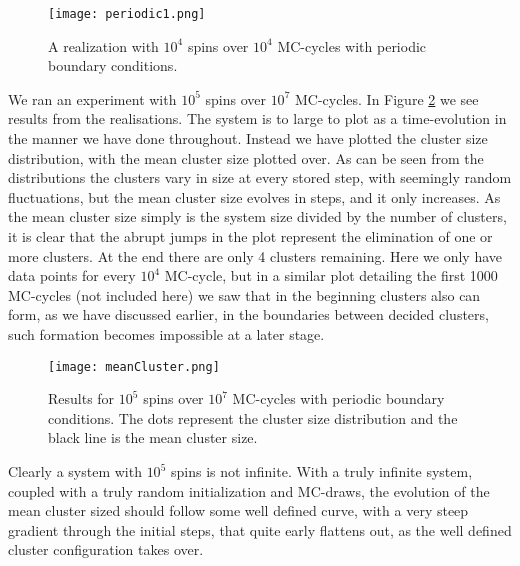 \documentclass[a4paper]{article}
\begin{document}
\begin{figure}[H]
\centerline{\texttt{[image: periodic1.png]}}
\caption{A realization with $10^4$ spins over $10^4$ MC-cycles with periodic boundary conditions.}
\label{fig:per}
\end{figure}

We ran an experiment with $10^5$ spins over $10^7$ MC-cycles. In Figure \ref{fig:menc} we see results from the realisations. The system is to large to plot as a time-evolution in the manner we have done throughout. Instead we have plotted the cluster size distribution, with the mean cluster size plotted over. As can be seen from the distributions the clusters vary in size at every stored step, with seemingly random fluctuations, but the mean cluster size evolves in steps, and it only increases. As the mean cluster size simply is the system size divided by the number of clusters, it is clear that the abrupt jumps in the plot represent the elimination of one or more clusters. At the end there are only 4 clusters remaining. Here we only have data points for every $10^4$ MC-cycle, but in a similar plot detailing the first 1000 MC-cycles (not included here) we saw that in the beginning clusters also can form, as we have discussed earlier, in the boundaries between decided clusters, such formation becomes impossible at a later stage.

\begin{figure}[H]
\centerline{\texttt{[image: meanCluster.png]}}
\caption{Results for  $10^5$ spins over $10^7$ MC-cycles with periodic boundary conditions. The dots represent the cluster size distribution and the black line is the mean cluster size.}
\label{fig:menc}
\end{figure}

Clearly a system with $10^5$ spins is not infinite. With a truly infinite system, coupled with a truly random initialization and MC-draws, the evolution of the mean cluster sized should follow some well defined curve, with a very steep gradient through the initial steps, that quite early flattens out, as the well defined cluster configuration takes over.
\end{document}
